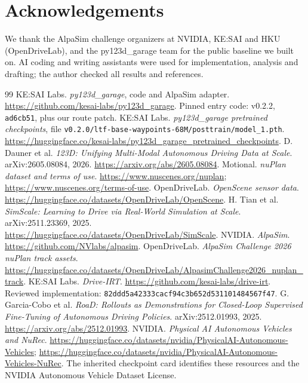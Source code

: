 \documentclass{article}
\begin{document}
\section*{Acknowledgements}
We thank the AlpaSim challenge organizers at NVIDIA, KE:SAI and HKU (OpenDriveLab), and the py123d\_garage team for the public baseline we built on. AI coding and writing assistants were used for implementation, analysis and drafting; the author checked all results and references.

\begin{thebibliography}{99}
 KE:SAI Labs. \emph{py123d\_garage}, code and AlpaSim adapter. \url{https://github.com/kesai-labs/py123d_garage}. Pinned entry code: v0.2.2, \texttt{ad6cb51}, plus our route patch.
 KE:SAI Labs. \emph{py123d\_garage pretrained checkpoints}, file \texttt{v0.2.0/ltf-base-waypoints-68M/posttrain/model\_1.pth}. \url{https://huggingface.co/kesai-labs/py123d_garage_pretrained_checkpoints}.
 D. Dauner et al. \emph{123D: Unifying Multi-Modal Autonomous Driving Data at Scale}. arXiv:2605.08084, 2026. \url{https://arxiv.org/abs/2605.08084}.
 Motional. \emph{nuPlan dataset and terms of use}. \url{https://www.nuscenes.org/nuplan}; \url{https://www.nuscenes.org/terms-of-use}.
 OpenDriveLab. \emph{OpenScene sensor data}. \url{https://huggingface.co/datasets/OpenDriveLab/OpenScene}.
 H. Tian et al. \emph{SimScale: Learning to Drive via Real-World Simulation at Scale}. arXiv:2511.23369, 2025. \url{https://huggingface.co/datasets/OpenDriveLab/SimScale}.
 NVIDIA. \emph{AlpaSim}. \url{https://github.com/NVlabs/alpasim}.
 OpenDriveLab. \emph{AlpaSim Challenge 2026 nuPlan track assets}. \url{https://huggingface.co/datasets/OpenDriveLab/AlpasimChallenge2026_nuplan_track}.
 KE:SAI Labs. \emph{Drive-IRT}. \url{https://github.com/kesai-labs/drive-irt}. Reviewed implementation: \texttt{82ddd5a42333cacf94c3b652d531101484567f47}.
 G. Garcia-Cobo et al. \emph{RoaD: Rollouts as Demonstrations for Closed-Loop Supervised Fine-Tuning of Autonomous Driving Policies}. arXiv:2512.01993, 2025. \url{https://arxiv.org/abs/2512.01993}.
 NVIDIA. \emph{Physical AI Autonomous Vehicles and NuRec}. \url{https://huggingface.co/datasets/nvidia/PhysicalAI-Autonomous-Vehicles}; \url{https://huggingface.co/datasets/nvidia/PhysicalAI-Autonomous-Vehicles-NuRec}. The inherited checkpoint card identifies these resources and the NVIDIA Autonomous Vehicle Dataset License.

\end{thebibliography}
\end{document}
